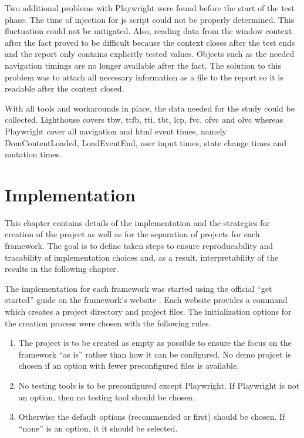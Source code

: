 \documentclass[a4paper, 10pt]{article}
\begin{document}
Two additional problems with Playwright were found before the start of the test phase.
The time of injection for \acrshort{js} script could not be properly determined.
This fluctuation could not be mitigated.
Also, reading data from the window context after the fact proved to be difficult because the context closes after the test ends and the report only contains explicitly tested values.
Objects such as the needed navigation timings are no longer available after the fact.
The solution to this problem was to attach all necessary information as a file to the report so it is readable after the context closed.

With all tools and workarounds in place, the data needed for the study could be collected.
Lighthouse covers \acrshort{tbw}, \acrshort{ttfb}, \acrshort{tti}, \acrshort{tbt}, \acrshort{lcp}, \acrshort{fvc}, \acrshort{ofvc} and \acrshort{olvc} whereas Playwright cover all navigation and \acrshort{html} event times, namely DomContentLoaded, LoadEventEnd, user input times, state change times and mutation times.


\section{Implementation}\label{sec:implementation} 
% 

This chapter contains details of the implementation and the strategies for creation of the project as well as for the separation of projects for each framework.
The goal is to define taken steps to ensure reproducability and tracability of implementation choices and, as a result, interpretability of the results in the following chapter.

The implementation for each framework was started using the official \enquote{get started} guide on the framework's website \citep{AngularGetStarted,AstroGetStarted,NextGetStarted,NuxtGetStarted,ReactGetStarted,SvelteGetStarted,VueGetStarted}.
Each website provides a command which creates a project directory and project files.
The initialization options for the creation process were chosen with the following rules.

\begin{enumerate}
  \item The project is to be created as empty as possible to ensure the focus on the framework \enquote{as is} rather than how it can be configured.
  No demo projcet is chosen if an option with fewer preconfigured files is available.
  \item No testing tools is to be preconfigured except Playwright.
  If Playwright is not an option, then no testing tool should be chosen.
  \item Otherwise the default options (recommended or first) should be chosen.
  If \enquote{none} is an option, it it should be selected.
\end{enumerate}
\end{document}
